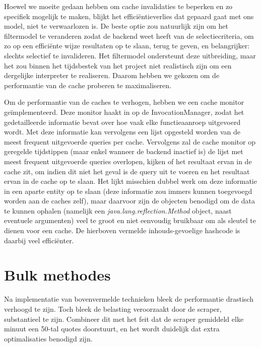 Hoewel we moeite gedaan hebben om cache invalidaties te beperken en zo specifiek mogelijk te maken, blijkt het effici\"entieverlies dat gepaard gaat met ons model, niet te verwaarlozen is. De beste optie zou natuurlijk zijn om het filtermodel te veranderen zodat de backend weet heeft van de selectiecriteria, om zo op een effici\"ente wijze resultaten op te slaan, terug te geven, en belangrijker: slechts selectief te invalideren. Het filtermodel ondersteunt deze uitbreiding, maar het zou binnen het tijdsbestek van het project niet realistisch zijn om een dergelijke interpreter te realiseren. Daarom hebben we gekozen om de performantie van de cache proberen te maximaliseren.

Om de performantie van de caches te verhogen, hebben we een cache monitor geïmplementeerd. Deze monitor haakt in op de InvocationManager, zodat het gedetailleerde informatie bevat over hoe vaak elke functieaanroep uitgevoerd wordt. Met deze informatie kan vervolgens een lijst opgesteld worden van de meest frequent uitgevoerde queries per cache. Vervolgens zal de cache monitor op geregelde tijdstippen (maar enkel wanneer de backend inactief is) de lijst met meest frequent uitgevoerde queries overlopen, kijken of het resultaat ervan in de cache zit, om indien dit niet het geval is de query uit te voeren en het resultaat ervan in de cache op te slaan.
Het lijkt misschien dubbel werk om deze informatie in een aparte entity op te slaan (deze informatie zou immers kunnen toegevoegd worden aan de caches zelf), maar daarvoor zijn de objecten benodigd om de data te kunnen ophalen (namelijk een \emph{java.lang.reflection.Method} object, naast eventuele argumenten) veel te groot en niet eenvoudig bruikbaar om als sleutel te dienen voor een cache. De hierboven vermelde inhouds-gevoelige hashcode is daarbij veel effici\"enter.


\section{Bulk methodes}

Na implementatie van bovenvermelde technieken bleek de performantie drastisch verhoogd te zijn. Toch bleek de belasting veroorzaakt door de scraper, substantieel te zijn. Combineer dit met het feit dat de scraper gemiddeld elke minuut een 50-tal quotes doorstuurt, en het wordt duidelijk dat extra optimalisaties benodigd zijn.


